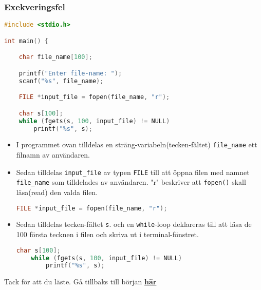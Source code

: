\documentclass[../main.tex]{subfiles}
\begin{document}
\subsubsection{Exekveringsfel}
\label{sec:exec}
\begin{lstlisting}[language=c]
#include <stdio.h>

int main() {

    char file_name[100];

    printf("Enter file-name: ");
    scanf("%s", file_name);

    FILE *input_file = fopen(file_name, "r");

    char s[100];
    while (fgets(s, 100, input_file) != NULL)
        printf("%s", s);
\end{lstlisting}

\begin{itemize}

    \item I programmet ovan tilldelas en sträng-variabeln(tecken-fältet) \texttt{file\_name} ett filnamn av användaren.
    
    \item Sedan tilldelas \texttt{input\_file} av typen \texttt{FILE} till att öppna filen med namnet \texttt{file\_name} som tilldelades av användaren. "r" beskriver att \texttt{fopen()} skall läsa(read) den valda filen.
    
    \begin{lstlisting}[language=c]
    FILE *input_file = fopen(file_name, "r");
    \end{lstlisting}
    
    \item Sedan tilldelas tecken-fältet \texttt{s}. och en \texttt{while}-loop deklareras till att läsa de 100 första tecknen i filen och skriva ut i terminal-fönstret.
    
    \begin{lstlisting}[language=c]
    char s[100];
    while (fgets(s, 100, input_file) != NULL)
        printf("%s", s);
    \end{lstlisting}
    
\end{itemize}

\begin{tcolorbox}[colback=green!5!white,colframe=green!75!black]
  Tack för att du läste. Gå tillbaks till början \hyperref[sec:top]{\textbf{här}}
\end{tcolorbox}
\end{document}
